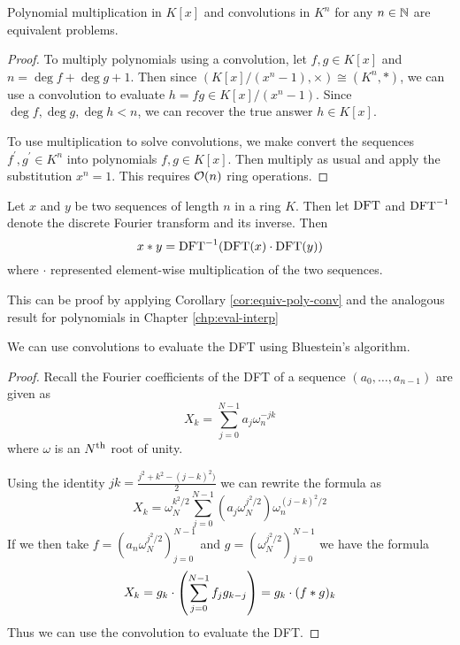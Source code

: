 \begin{corollary}\label{cor:eqiv-poly-conv}
    Polynomial multiplication in $K[x]$ and convolutions in $K^n$ for any $n \in {\mathbb N}$ are equivalent problems.
\end{corollary}

\begin{proof}
    To multiply polynomials using a convolution, let $f, g \in K[x]$ and $n = \deg f + \deg g + 1$. Then since $(K[x]/(x^n - 1), \times) \cong (K^n, \ast)$, we can use a convolution to evaluate $h = fg \in K[x]/(x^n -1)$. Since $\deg f, \deg g, \deg h < n$, we can recover the true answer $h \in K[x]$.

    To use multiplication to solve convolutions, we make convert the sequences $f^\prime, g^\prime \in K^n$ into polynomials $f, g \in K[x]$. Then multiply as usual and apply the substitution $x^n = 1$. This requires $\mathcal O(n)$ ring operations.
\end{proof}

\begin{definition}\label{def:convolution-property}
    Let $x$ and $y$ be two sequences of length $n$ in a ring $K$. Then let $\textrm{DFT}$ and $\textrm{DFT}^{-1}$ denote the discrete Fourier transform and its inverse. Then
    \[
        x \ast y = \textrm{DFT}^{-1}(\textrm{DFT}(x) \cdot \textrm{DFT}(y))
    \]
    where $\cdot$ represented element-wise multiplication of the two sequences.
\end{definition}

This can be proof by applying Corollary \ref{cor:equiv-poly-conv} and the analogous result for polynomials in Chapter \ref{chp:eval-interp}


\begin{proposition}
    We can use convolutions to evaluate the DFT using Bluestein's algorithm.
\end{proposition}

\begin{proof}
    Recall the Fourier coefficients of the DFT of a sequence $(a_0, \ldots, a_{n-1})$ are given as
    \[
        X_k = \sum^{N-1}_{j=0} a_j\omega_n^{-jk}
    \]
    where $\omega$ is an $N^{\textrm{th}}$ root of unity.
    
    Using the identity $jk = \frac{j^2 + k^2 - (j - k)^2)}{2}$ we can rewrite the formula as
    \[
        X_k = \omega_N^{k^2/2} \sum^{N-1}_{j=0} (a_j \omega_N^{j^2/2}) \omega_n^{(j - k)^2/2}
    \]
    If we then take $f = (a_n \omega_N^{j^2/2})_{j=0}^{N-1}$ and $g = (\omega_N^{j^2/2})_{j=0}^{N-1}$ we have the formula
    \[
        X_k = g_k \cdot \left(\sum^{N-1}_{j=0} f_j g_{k-j}\right) = g_k \cdot (f \ast g)_k
    \]
    Thus we can use the convolution to evaluate the DFT.
\end{proof}


